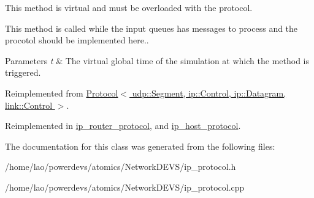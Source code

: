 This method is virtual and must be overloaded with the protocol. 

This method is called while the input queues has messages to process and the procotol should be implemented here..


\begin{DoxyParams}{Parameters}
{\em t} & The virtual global time of the simulation at which the method is triggered. \\
\hline
\end{DoxyParams}


Reimplemented from \hyperlink{classProtocol_a9c6247fa4ea8524d1214fca4cacbd781}{Protocol$<$ udp\+::\+Segment, ip\+::\+Control, ip\+::\+Datagram, link\+::\+Control $>$}.



Reimplemented in \hyperlink{classip__router__protocol_a14cf3c7e1418ee8c6035b79626f99438}{ip\+\_\+router\+\_\+protocol}, and \hyperlink{classip__host__protocol_a2e2c43aeb81ae38702b7dec6f7df9227}{ip\+\_\+host\+\_\+protocol}.



The documentation for this class was generated from the following files\+:\begin{DoxyCompactItemize}
\item 
/home/lao/powerdevs/atomics/\+Network\+D\+E\+V\+S/ip\+\_\+protocol.\+h\item 
/home/lao/powerdevs/atomics/\+Network\+D\+E\+V\+S/ip\+\_\+protocol.\+cpp\end{DoxyCompactItemize}
